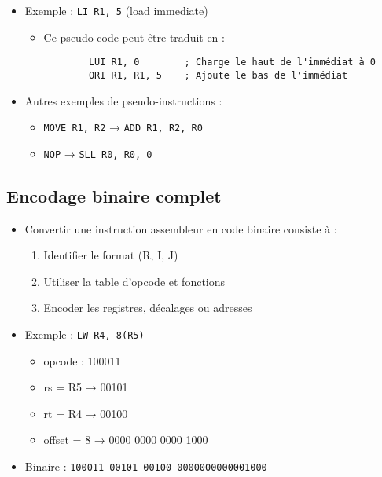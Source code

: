 \documentclass[12pt,a4paper]{article}
\begin{document}
\begin{itemize}
    \item Exemple : \texttt{LI R1, 5} (load immediate)
    \begin{itemize}
        \item Ce pseudo-code peut être traduit en :
        \begin{verbatim}
        LUI R1, 0        ; Charge le haut de l'immédiat à 0
        ORI R1, R1, 5    ; Ajoute le bas de l'immédiat
        \end{verbatim}
    \end{itemize}
    \item Autres exemples de pseudo-instructions :
    \begin{itemize}
        \item \texttt{MOVE R1, R2} → \texttt{ADD R1, R2, R0}
        \item \texttt{NOP} → \texttt{SLL R0, R0, 0}
    \end{itemize}
\end{itemize}

\subsection{Encodage binaire complet}
\begin{itemize}
    \item Convertir une instruction assembleur en code binaire consiste à :
    \begin{enumerate}
        \item Identifier le format (R, I, J)
        \item Utiliser la table d’opcode et fonctions
        \item Encoder les registres, décalages ou adresses
    \end{enumerate}
    \item Exemple : \texttt{LW R4, 8(R5)}
    \begin{itemize}
        \item opcode : 100011
        \item rs = R5 → 00101
        \item rt = R4 → 00100
        \item offset = 8 → 0000 0000 0000 1000
    \end{itemize}
    \item Binaire : \texttt{100011 00101 00100 0000000000001000}
\end{itemize}

\newpage
\end{document}
